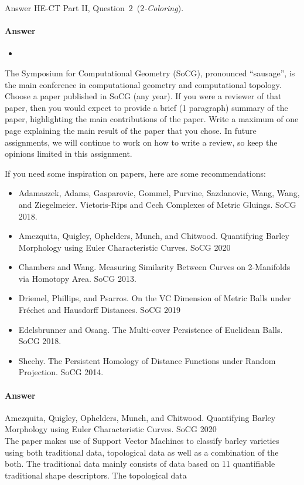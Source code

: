\documentclass{article}
\begin{document}
Answer HE-CT Part II, Question~$2$~(\emph{$2$-Coloring}).

\paragraph{Answer}

\begin{itemize}
	\item 
\end{itemize}


The Symposium for Computational Geometry (SoCG), pronounced ``sausage'', is the
main conference in computational geometry and computational topology.
Choose a paper published in SoCG (any year).  If
you were a reviewer of that paper, then you would expect to provide a brief (1
paragraph) summary of the paper, highlighting the main contributions of the
paper.  Write a maximum of one page explaining the main result of the paper that
you chose.  In future assignments, we will continue to work on how to write a
review, so keep the opinions limited in this assignment.

If you need some inspiration on papers, here are some recommendations:
\begin{itemize}
    \item  Adamaszek, Adams,  Gasparovic, Gommel, Purvine, Sazdanovic,
        Wang, Wang, and Ziegelmeier. Vietoris-Rips and Cech Complexes of Metric
        Gluings. SoCG 2018.
    \item  Amezquita, Quigley, Ophelders, Munch, and Chitwood. Quantifying Barley Morphology using Euler Characteristic Curves. SoCG
        2020
    \item Chambers and Wang. Measuring Similarity Between Curves on 2-Manifolds
        via Homotopy Area. SoCG 2013.
    \item Driemel, Phillips, and Psarros.
        On the VC Dimension of Metric Balls under Fr\'echet and Hausdorff
        Distances. SoCG 2019
    \item Edelsbrunner and Osang. The Multi-cover Persistence of Euclidean
        Balls. SoCG 2018.
    \item Sheehy. The Persistent Homology of Distance Functions under Random
        Projection. SoCG 2014.
\end{itemize}

\paragraph{Answer} 
 Amezquita, Quigley, Ophelders, Munch, and Chitwood. Quantifying Barley Morphology using Euler Characteristic Curves. SoCG
        2020 \\
        
The paper makes use of Support Vector Machines to classify barley varieties using both traditional data, topological data as well as a combination of the both. The traditional data mainly consists of data based on 11 quantifiable traditional shape descriptors. The topological data 
\end{document}
